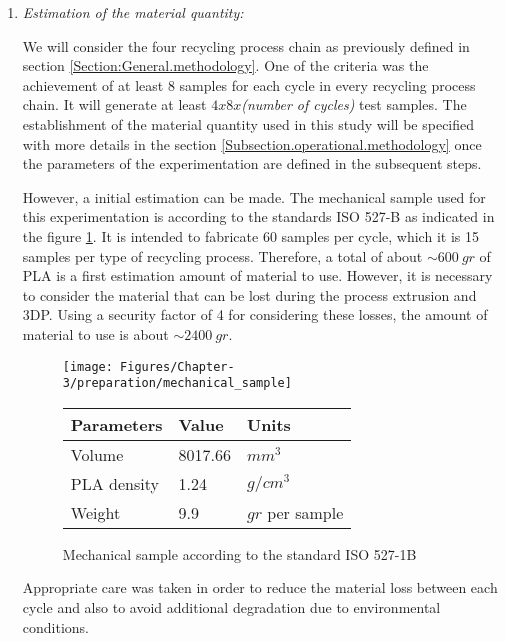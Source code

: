 \begin{enumerate}[leftmargin=0in,label=\emph{\alph*}.]
	
	
	\item \textit{Estimation of the material quantity:}
	
	We will consider the four recycling process chain as previously defined in section  \ref{Section:General.methodology}.
	One of the criteria was the achievement of at least 8 samples for each cycle in every recycling process chain.
	 It will generate at least $ 4x8x$\textit{(number of cycles)} test samples.
	The establishment of the material quantity used in this study will be specified with more details  in the section \ref{Subsection.operational.methodology} once the parameters of the experimentation are defined in the subsequent steps. 

	
	However, a initial estimation can be made.
	The mechanical sample used for this experimentation is according to the standards ISO 527-B as indicated in the figure \ref{mechanical.sample}. 
	It is intended to fabricate 60 samples per cycle, which it is 15 samples per type of recycling process. 
	Therefore, a total of about $\sim 600~gr$ of PLA is a first estimation amount of material to use. 
	However, it is necessary to consider the material that can be lost during the process extrusion and 3DP. Using a security factor of 4 for considering these losses, the amount of material to use is about  $\sim 2400~gr$. 
	
	
	\begin{figure}[!ht]
		\centering
		\texttt{[image: Figures/Chapter-3/preparation/mechanical\_sample]}
		\qquad
		\begin{tabular}[b]{lll}
			\toprule
			\textbf{Parameters } & \textbf{Value } & \textbf{Units} \\
			\midrule
			Volume	& 8017.66	&	$mm^3$			\\
			PLA density 		& 1.24	& $g/cm^3$		\\
			Weight	& 9.9  & $gr$ per sample		\\		
			\bottomrule
		\end{tabular}
		\caption{Mechanical sample according to the standard ISO 527-1B}
		\label{mechanical.sample}
	\end{figure}



	

	Appropriate care was taken in order to reduce the material loss between each cycle and also to avoid additional degradation due to environmental conditions.


\end{enumerate}

